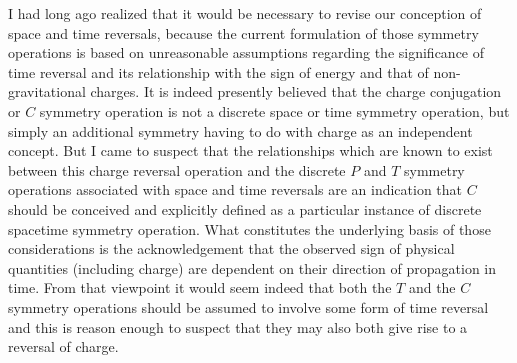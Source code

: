 \documentclass[notitlepage,12pt]{report}
\begin{document}
I had long ago realized that it would be necessary to revise our conception of space and time reversals, because the current formulation of those symmetry operations is based on unreasonable assumptions regarding the significance of time reversal and its relationship with the sign of energy and that of non-gravitational charges. It is indeed presently believed that the charge conjugation or $C$ symmetry operation is not a discrete space or time symmetry operation, but simply an additional symmetry having to do with charge as an independent concept. But I came to suspect that the relationships which are known to exist between this charge reversal operation and the discrete $P$ and $T$ symmetry operations associated with space and time reversals are an indication that $C$ should be conceived and explicitly defined as a particular instance of discrete spacetime symmetry operation. What constitutes the underlying basis of those considerations is the acknowledgement that the observed sign of physical quantities (including charge) are dependent on their direction of propagation in time. From that viewpoint it would seem indeed that both the $T$ and the $C$ symmetry operations should be assumed to involve some form of time reversal and this is reason enough to suspect that they may also both give rise to a reversal of charge.
\end{document}
